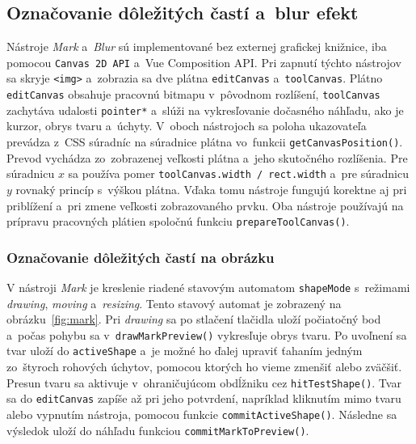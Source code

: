 \subsection{Označovanie dôležitých častí a~blur efekt}
\label{subsec:mark_blur_tools}

Nástroje \emph{Mark} a~\emph{Blur} sú implementované bez externej grafickej knižnice, iba pomocou \texttt{Canvas 2D API} a~Vue Composition API. Pri zapnutí týchto nástrojov sa skryje \texttt{<img>} a~zobrazia sa dve plátna \texttt{editCanvas} a~\texttt{toolCanvas}. Plátno \texttt{editCanvas} obsahuje pracovnú bitmapu v~pôvodnom rozlíšení, \texttt{toolCanvas} zachytáva udalosti \texttt{pointer*} a~slúži na vykresľovanie dočasného náhľadu, ako je kurzor, obrys tvaru a~úchyty. V~oboch nástrojoch sa poloha ukazovateľa prevádza z~CSS súradníc na súradnice plátna vo~funkcii \texttt{getCanvasPosition()}. Prevod vychádza zo~zobrazenej veľkosti plátna a~jeho skutočného rozlíšenia. Pre súradnicu \(x\) sa používa pomer \texttt{toolCanvas.width / rect.width} a~pre súradnicu \(y\) rovnaký princíp s~výškou plátna. Vďaka tomu nástroje fungujú korektne aj pri priblížení a~pri zmene veľkosti zobrazovaného prvku. Oba nástroje používajú na prípravu pracovných plátien spoločnú funkciu \texttt{prepareToolCanvas()}.

\subsubsection{Označovanie dôležitých častí na obrázku}

V nástroji \emph{Mark} je kreslenie riadené stavovým automatom \texttt{shapeMode} s~režimami \emph{drawing}, \emph{moving} a~\emph{resizing}. Tento stavový automat je zobrazený na obrázku~\ref{fig:mark}. Pri \emph{drawing} sa po stlačení tlačidla uloží počiatočný bod a~počas pohybu sa v~\texttt{drawMarkPreview()} vykresľuje obrys tvaru. Po uvoľnení sa tvar uloží do \texttt{activeShape} a~je možné ho ďalej upraviť ťahaním jedným zo~štyroch rohových úchytov, pomocou ktorých ho vieme zmenšiť alebo zväčšiť. Presun tvaru sa aktivuje v~ohraničujúcom obdĺžniku cez \texttt{hitTestShape()}. Tvar sa do \texttt{editCanvas} zapíše až pri jeho potvrdení, napríklad kliknutím mimo tvaru alebo vypnutím nástroja, pomocou funkcie \texttt{commitActiveShape()}. Následne sa výsledok uloží do náhľadu funkciou \texttt{commitMarkToPreview()}.


